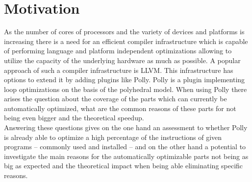 \chapter{Motivation}
As the number of cores of processors and the variety of devices and platforms is increasing there is a need for an efficient compiler infrastructure which is capable of performing language and platform independent optimizations allowing to utilize the capacity of the underlying hardware as much as possible.
A popular approach of such a compiler infrastructure is LLVM. \cite{LLVMUsers}
This infrastructure has options to extend it by adding plugins like Polly.
Polly is a plugin implementing loop optimizations on the basis of the polyhedral model.
When using Polly there arises the question about the coverage of the parts which can currently be automatically optimized, what are the common reasons of these parts for not being even bigger and the theoretical speedup.\\
Answering these questions gives on the one hand an assessment to whether Polly is already able to optimize a high percentage of the instructions of given programs -- commonly used and installed -- and on the other hand a potential to investigate the main reasons for the automatically optimizable parts not being as big as expected and the theoretical impact when being able eliminating specific reasons.
